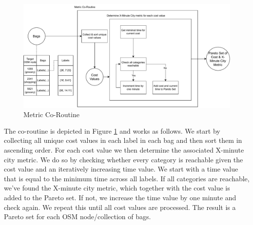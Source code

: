 \begin{figure}
    \centering
    \includegraphics[scale=0.50]{Figures/method/metric_coroutine}
    \caption{Metric Co-Routine}
    \label{fig:metric_co_routine}
\end{figure}
The co-routine is depicted in Figure \ref{fig:metric_co_routine} and works as follows.
We start by collecting all unique cost values in each label in each bag and then sort them in ascending order.
For each cost value we then determine the associated X-minute city metric.
We do so by checking whether every category is reachable given the cost value and an iteratively increasing time value.
We start with a time value that is equal to the minimum time across all labels.
If all categories are reachable, we've found the X-minute city metric, which together with the cost value is added to the Pareto set.
If not, we increase the time value by one minute and check again.
We repeat this until all cost values are processed.
The result is a Pareto set for each OSM node/collection of bags.
